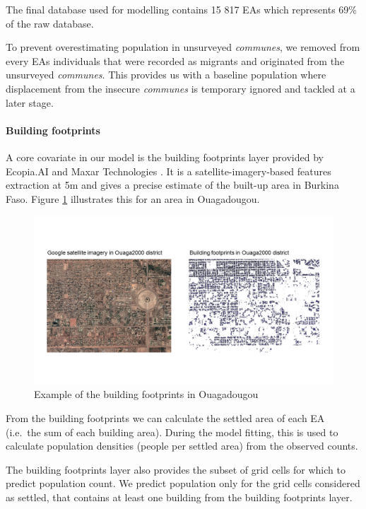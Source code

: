 \documentclass[]{book}
\let\oldparagraph\paragraph
\renewcommand{\paragraph}[1]{\oldparagraph{#1}\mbox{}}
\begin{document}
The final database used for modelling contains 15 817 EAs which
represents 69\% of the raw database.

To prevent overestimating population in unsurveyed \emph{communes}, we
removed from every EAs individuals that were recorded as migrants and
originated from the unsurveyed \emph{communes}. This provides us with a
baseline population where displacement from the insecure \emph{communes}
is temporary ignored and tackled at a later stage.

\paragraph{Building footprints}\label{building-footprints}

A core covariate in our model is the building footprints layer provided
by Ecopia.AI and Maxar Technologies \citeyearpar{ecopia.ai2019}. It is a
satellite-imagery-based features extraction at 5m and gives a precise
estimate of the built-up area in Burkina Faso. Figure \ref{fig:img-bf1}
illustrates this for an area in Ouagadougou.

\begin{figure}

{\centering \includegraphics[width=0.8\linewidth]{dat/BFAv1/bf_example} 

}

\caption{Example of the building footprints in Ouagadougou}\label{fig:img-bf1}
\end{figure}

From the building footprints we can calculate the settled area of each
EA (i.e.~the sum of each building area). During the model fitting, this
is used to calculate population densities (people per settled area) from
the observed counts.

The building footprints layer also provides the subset of grid cells for
which to predict population count. We predict population only for the
grid cells considered as settled, that contains at least one building
from the building footprints layer.
\end{document}
